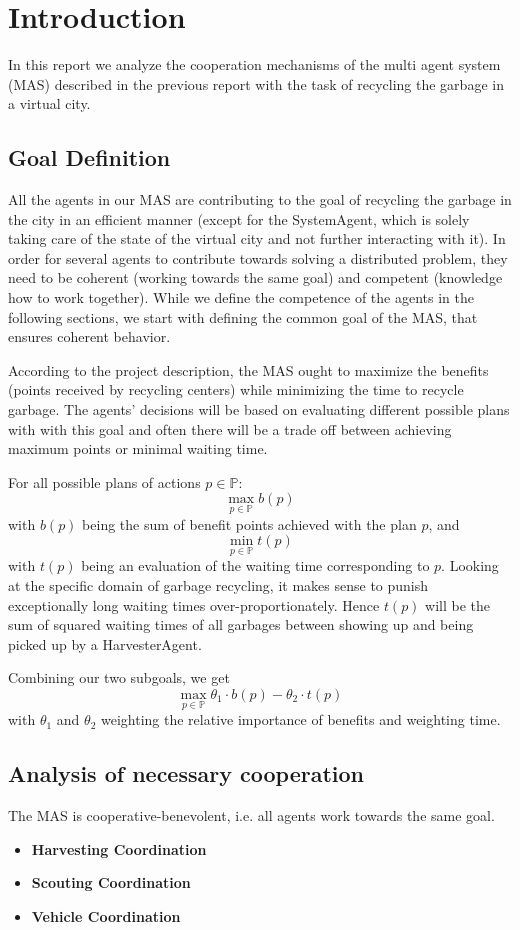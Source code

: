 \section{Introduction}

In this report we analyze the cooperation mechanisms of the multi agent system (MAS) described in the previous report with the task of recycling the garbage in a virtual city.

\subsection{Goal Definition}

All the agents in our MAS are contributing to the goal of recycling the garbage in the city in an efficient manner (except for the SystemAgent, which is solely taking care of the state of the virtual city and not further interacting with it). In order for several agents to contribute towards solving a distributed problem, they need to be coherent (working towards the same goal) and competent (knowledge how to work together). While we define the competence of the agents in the following sections, we start with defining the common goal of the MAS, that ensures coherent behavior.

According to the project description, the MAS ought to maximize the benefits (points received by recycling centers) while minimizing the time to recycle garbage. The agents' decisions will be based on evaluating different possible plans with with this goal and often there will be a trade off between achieving maximum points or minimal waiting time. 

For all possible plans of actions $ p \in \mathbb{P} $: \[ \max_{p \in \mathbb{P}} b(p)\] with $ b(p) $ being the sum of benefit points achieved with the plan $p$, and \[ \min_{p \in \mathbb{P}} t(p)\] with $t(p)$ being an evaluation of the waiting time corresponding to $p$. Looking at the specific domain of garbage recycling, it makes sense to punish exceptionally long waiting times over-proportionately. Hence $ t(p) $ will be the sum of squared waiting times of all garbages between showing up and being picked up by a HarvesterAgent.

Combining our two subgoals, we get \[ \max_{p \in \mathbb{P}} \theta_1 \cdot b(p) - \theta_2 \cdot t(p)\] with $ \theta_1 $ and $ \theta_2 $ weighting the relative importance of benefits and weighting time.

\subsection{Analysis of necessary cooperation}

The MAS is cooperative-benevolent, i.e. all agents work towards the same goal.


\begin{itemize}
	\item \textbf{Harvesting Coordination}
	\item \textbf{Scouting Coordination}
	\item \textbf{Vehicle Coordination}
\end{itemize}